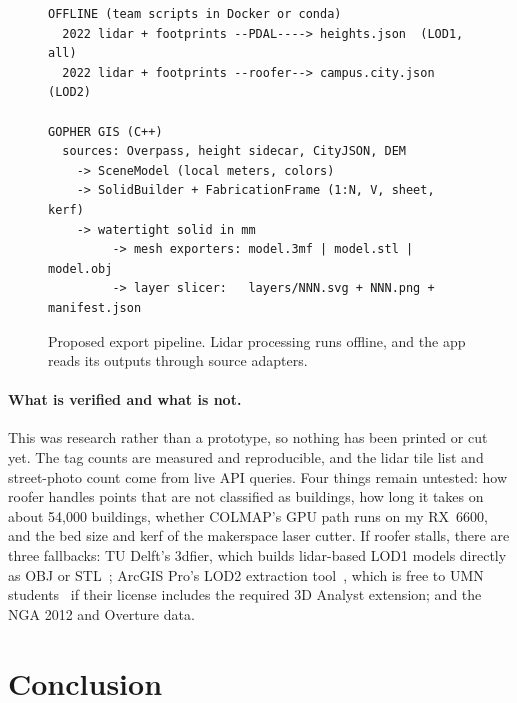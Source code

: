 \documentclass[11pt,letterpaper]{article}
\begin{document}
\begin{figure}[!htbp]
  \centering
  \begin{minipage}{0.88\textwidth}
    \small
\begin{verbatim}
OFFLINE (team scripts in Docker or conda)
  2022 lidar + footprints --PDAL----> heights.json  (LOD1, all)
  2022 lidar + footprints --roofer--> campus.city.json  (LOD2)

GOPHER GIS (C++)
  sources: Overpass, height sidecar, CityJSON, DEM
    -> SceneModel (local meters, colors)
    -> SolidBuilder + FabricationFrame (1:N, V, sheet, kerf)
    -> watertight solid in mm
         -> mesh exporters: model.3mf | model.stl | model.obj
         -> layer slicer:   layers/NNN.svg + NNN.png + manifest.json
\end{verbatim}
  \end{minipage}
  \caption{Proposed export pipeline. Lidar processing runs offline, and the app reads its outputs through source adapters.}
  \label{fig:pipeline}
\end{figure}

\paragraph{What is verified and what is not.} This was research rather than a prototype, so nothing has been printed or cut yet. The tag counts are measured and reproducible, and the lidar tile list and street-photo count come from live API queries. Four things remain untested: how roofer handles points that are not classified as buildings, how long it takes on about 54,000 buildings, whether COLMAP's GPU path runs on my RX~6600, and the bed size and kerf of the makerspace laser cutter. If roofer stalls, there are three fallbacks: TU Delft's 3dfier, which builds lidar-based LOD1 models directly as OBJ or STL~\cite{threedfier}; ArcGIS Pro's LOD2 extraction tool~\cite{esrilod2}, which is free to UMN students~\cite{uspatial} if their license includes the required 3D Analyst extension; and the NGA 2012 and Overture data.

\section*{Conclusion}
\end{document}

